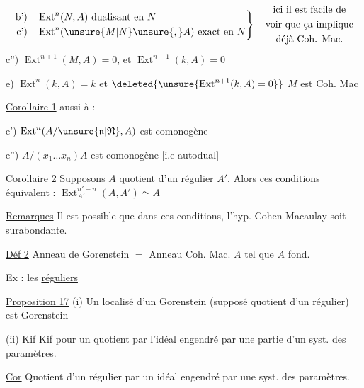 \[
\left.\begin{aligned}
 \text{b')}\quad &\operatorname{Ext}^{n}(N,A)\ \text{dualisant en }N\\
 \text{c')}\quad &\operatorname{Ext}^{n}(\unsure{M|N}\unsure{,}A)\ \text{exact en }N
\end{aligned}\right\}
\quad\begin{gathered}\text{ici il est facile de}\\\text{voir que ça implique}\\\text{déjà Coh. Mac.}\end{gathered}
\]
c'') $\operatorname{Ext}^{n+1}(M,A)=0$, et $\operatorname{Ext}^{n-1}(k,A)=0$

e) $\operatorname{Ext}^{n}(k,A)=k$ et $\deleted{\unsure{\operatorname{Ext}^{n+1}(k,A)=0}}$ $M$ est Coh. Mac



\uline{Corollaire 1}  aussi à :

e') $\operatorname{Ext}^{n}(A/\unsure{\mathfrak n|\mathfrak N},A)$ est comonogène

e'') $A/(x_1\ldots x_n)A$ est comonogène [i.e autodual]

\uline{Corollaire 2} Supposons $A$ quotient d'un régulier $A'$. Alors ces conditions équivalent : $\operatorname{Ext}_{A'}^{n'-n}(A,A')\simeq A$

\uline{Remarques}  Il est possible que dans  ces conditions, l'hyp. Cohen-Macaulay soit surabondante.

\uline{Déf 2} Anneau de Gorenstein $=$ Anneau Coh. Mac. $A$ tel que $A$  fond.

Ex : les \uline{réguliers}

\uline{Proposition 17} (i) Un localisé d'un Gorenstein (supposé quotient d'un régulier) est Gorenstein

(ii) Kif Kif pour un quotient par l'idéal engendré par une partie d'un syst. des paramètres.

\uline{Cor} Quotient d'un régulier par un idéal engendré par une  syst. des paramètres.

